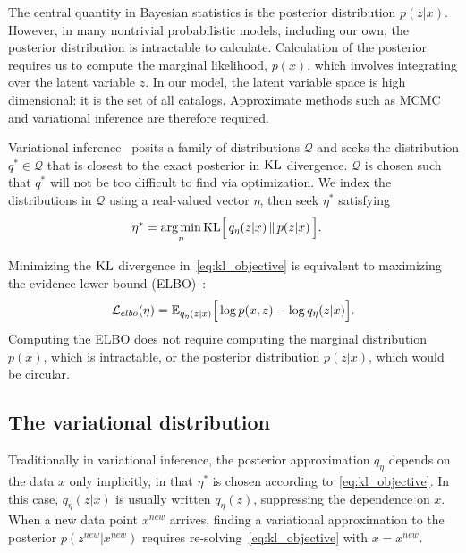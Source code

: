 The central quantity in Bayesian statistics is the posterior distribution $p(z|x)$.
However, in many
nontrivial probabilistic models, including our own, the posterior distribution is intractable to calculate.
Calculation of the posterior requires us to compute the marginal likelihood, $p(x)$, which involves integrating over the latent variable $z$. 
In our model, the latent variable space is high dimensional: it is the set of all catalogs. Approximate methods such as MCMC and variational inference are therefore required. 

Variational inference~\citep{Jordan_intro_vi, Wainwrite_graph_models_vi, Blei_2017_vi_review} posits a family of distributions $\mathcal{Q}$ and seeks
the distribution $q^*\in \mathcal{Q}$ that is closest to the exact posterior
in $\textrm{KL}$ divergence. 
$\mathcal{Q}$ is chosen such that $q^*$ will not be too difficult to find via optimization. 
We index the distributions in $\mathcal{Q}$ using a real-valued vector $\eta$, then seek $\eta^*$ satisfying
\begin{align}
   \eta^* &= \operatorname*{arg\,min}_{\eta} \mathrm{KL}\Big[\,q_\eta(z | x)\, \| \,p(z | x)\,\Big].
   \label{eq:kl_objective}
\end{align}

Minimizing the $\textrm{KL}$ divergence in~\eqref{eq:kl_objective} is equivalent to maximizing the evidence lower bound (ELBO)~\citep{Blei_2017_vi_review}:
\begin{align}
    \mathcal{L}_{elbo}(\eta) = 
    \mathbb{E}_{q_\eta(z | x)}\Big[\log p(x, z) - \log q_\eta(z | x)\Big].
    \label{eq:elbo}
\end{align}
Computing the ELBO does not require computing the marginal distribution $p(x)$, which is intractable, or the posterior distribution $p(z | x)$, which would be circular. 

\subsection{The variational distribution}
\label{sec:var_distr}
Traditionally in variational inference, the posterior approximation $q_\eta$ depends on the data $x$ only implicitly, 
in that $\eta^*$ is chosen according to~\eqref{eq:kl_objective}.
In this case, $q_\eta(z | x)$ is usually written $q_\eta(z)$, suppressing the dependence on $x$. 
When a new data point $x^{new}$ arrives, finding a variational  approximation to the posterior $p(z^{new} | x^{new})$ requires re-solving~\eqref{eq:kl_objective} with $x = x^{new}$.


